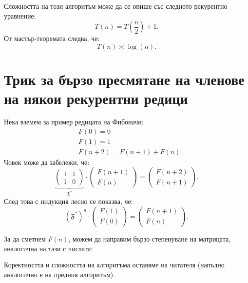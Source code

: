 Сложността на този алгоритъм може да се опише със следното рекурентно уравнение:
\[
    T(n) = T(\frac{n}{2}) + 1.
\]
От мастър-теоремата следва, че:
\[
    T(n) \asymp \log(n).
\]

\section{Трик за бързо пресмятане на членове на някои рекурентни редици}

Нека вземем за пример редицата на Фибоначи:
\begin{align*}
     & F(0) = 0                   \\
     & F(1) = 1                   \\
     & F(n + 2) = F(n + 1) + F(n)
\end{align*}
Човек може да забележи, че:
\[
    \underbrace{\begin{pmatrix}
            1 & 1 \\
            1 & 0
        \end{pmatrix}}_{\mathfrak{F}^*}
    \cdot
    \begin{pmatrix}
        F(n + 1) \\
        F(n)
    \end{pmatrix}
    =
    \begin{pmatrix}
        F(n + 2) \\
        F(n + 1)
    \end{pmatrix}.
\]
След това с индукция лесно се показва, че:
\[
    (\mathfrak{F}^*)^n
    \cdot
    \begin{pmatrix}
        F(1) \\
        F(0)
    \end{pmatrix}
    =
    \begin{pmatrix}
        F(n + 1) \\
        F(n)
    \end{pmatrix}.
\]

За да сметнем $F(n)$, можем да направим бързо степенуване на матрицата, аналогична на тази с числата:


Коректността и сложността на алгоритъма оставяме на читателя (напълно аналогично е на предния алгоритъм).

